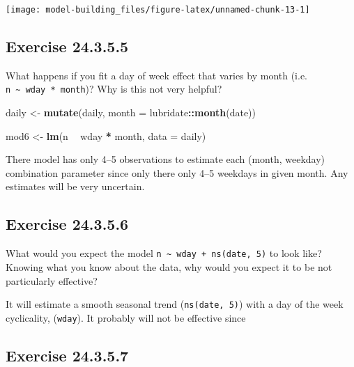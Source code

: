 \documentclass[]{book}
\newenvironment{Shaded}{\begin{snugshade}}{\end{snugshade}}
\newcommand{\DataTypeTok}[1]{\textcolor[rgb]{0.13,0.29,0.53}{#1}}
\newcommand{\KeywordTok}[1]{\textcolor[rgb]{0.13,0.29,0.53}{\textbf{#1}}}
\newcommand{\NormalTok}[1]{#1}
\newcommand{\OperatorTok}[1]{\textcolor[rgb]{0.81,0.36,0.00}{\textbf{#1}}}
\newcommand{\StringTok}[1]{\textcolor[rgb]{0.31,0.60,0.02}{#1}}
\theoremstyle{plain}
\theoremstyle{remark}
\begin{document}
\begin{center}\texttt{[image: model-building\_files/figure-latex/unnamed-chunk-13-1]} \end{center}

\hypertarget{exercise-24.3.5.5}{%
\subsection*{\texorpdfstring{Exercise
{24.3.5.5}}{Exercise 24.3.5.5}}\label{exercise-24.3.5.5}}

What happens if you fit a day of week effect that varies by month (i.e.
\texttt{n\ \textasciitilde{}\ wday\ *\ month})? Why is this not very
helpful?

\begin{Shaded}
\begin{Highlighting}[]
\NormalTok{daily <-}\StringTok{ }\KeywordTok{mutate}\NormalTok{(daily, }\DataTypeTok{month =}\NormalTok{ lubridate}\OperatorTok{::}\KeywordTok{month}\NormalTok{(date))}

\NormalTok{mod6 <-}\StringTok{ }\KeywordTok{lm}\NormalTok{(n }\OperatorTok{~}\StringTok{ }\NormalTok{wday }\OperatorTok{*}\StringTok{ }\NormalTok{month, }\DataTypeTok{data =}\NormalTok{ daily)}
\end{Highlighting}
\end{Shaded}

There model has only 4--5 observations to estimate each (month, weekday)
combination parameter since only there only 4--5 weekdays in given
month. Any estimates will be very uncertain.

\hypertarget{exercise-24.3.5.6}{%
\subsection*{\texorpdfstring{Exercise
{24.3.5.6}}{Exercise 24.3.5.6}}\label{exercise-24.3.5.6}}

What would you expect the model
\texttt{n\ \textasciitilde{}\ wday\ +\ ns(date,\ 5)} to look like?
Knowing what you know about the data, why would you expect it to be not
particularly effective?

It will estimate a smooth seasonal trend (\texttt{ns(date,\ 5)}) with a
day of the week cyclicality, (\texttt{wday}). It probably will not be
effective since

\hypertarget{exercise-24.3.5.7}{%
\subsection*{\texorpdfstring{Exercise
{24.3.5.7}}{Exercise 24.3.5.7}}\label{exercise-24.3.5.7}}
\end{document}
